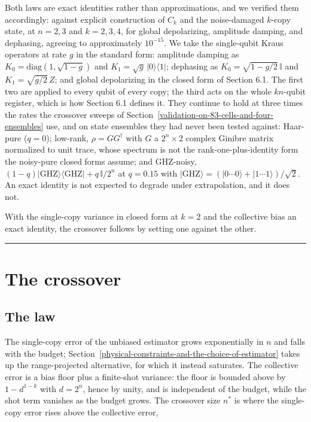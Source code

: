 \documentclass[a4paper,superscriptaddress,nofootinbib,onecolumn,nopdfoutputerror]{quantumarticle}
\begin{document}
Both laws are exact identities rather than approximations, and we
verified them accordingly: against explicit construction of \(C_k\) and
the noise-damaged \(k\)-copy state, at \(n = 2, 3\) and \(k = 2, 3, 4\),
for global depolarizing, amplitude damping, and dephasing, agreeing to
approximately \(10^{-15}\). We take the single-qubit Kraus operators at
rate \(g\) in the standard form: amplitude damping as
\(K_0 = \mathrm{diag}(1, \sqrt{1-g})\) and
\(K_1 = \sqrt{g}\,\lvert 0 \rangle \langle 1 \rvert\); dephasing as
\(K_0 = \sqrt{1 - g/2}\,\mathbb{I}\) and \(K_1 = \sqrt{g/2}\,Z\); and
global depolarizing in the closed form of Section 6.1. The first two are applied to every qubit
of every copy; the third acts on the whole \(kn\)-qubit register, which is how Section 6.1
defines it. They continue to hold at three times the rates the crossover sweeps of
Section~\ref{validation-on-83-cells-and-four-ensembles} use, and on state ensembles they had never
been tested against: Haar-pure (\(q = 0\)); low-rank,
\(\rho = GG^\dagger\) with \(G\) a \(2^n \times 2\) complex Ginibre
matrix normalized to unit trace, whose spectrum is not the
rank-one-plus-identity form the noisy-pure closed forms assume; and
GHZ-noisy,
\((1-q)\lvert \mathrm{GHZ} \rangle \langle \mathrm{GHZ} \rvert + q\,\mathbb{I}/2^n\)
at \(q = 0.15\) with
\(\lvert \mathrm{GHZ} \rangle = (\lvert 0 \cdots 0 \rangle + \lvert 1 \cdots 1 \rangle)/\sqrt{2}\).
An exact identity is not expected to degrade under extrapolation, and it
does not.

With the single-copy variance in closed form at \(k=2\) and the
collective bias an exact identity, the crossover follows by setting one
against the other.

\begin{center}\rule{0.5\linewidth}{0.5pt}\end{center}

\hypertarget{the-crossover}{%
\section{The crossover}\label{the-crossover}}

\hypertarget{the-law}{%
\subsection{The law}\label{the-law}}

The single-copy error of the unbiased estimator grows exponentially in
\(n\) and falls with the budget;
Section~\ref{physical-constraints-and-the-choice-of-estimator} takes up the
range-projected alternative, for which it instead saturates. The collective
error is a bias floor plus a finite-shot variance:
the floor is bounded above by \(1 - d^{1-k}\) with \(d = 2^n\), hence by
unity, and is independent of the budget, while the shot term vanishes as
the budget grows. The crossover size \(n^*\) is where the single-copy
error rises above the collective error,
\end{document}
